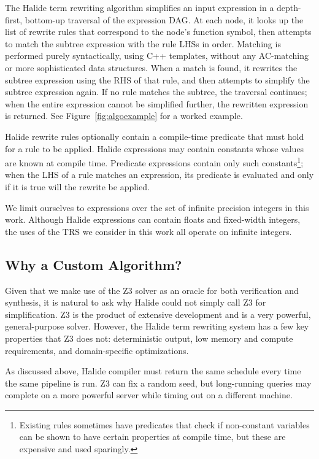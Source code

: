 \documentclass[acmsmall,review,anonymous]{acmart}\settopmatter{printfolios=true,printccs=false,printacmref=false}
\begin{document}
The Halide term rewriting algorithm simplifies an input expression in a
depth-first, bottom-up traversal of the expression DAG. At each node, it looks
up the list of rewrite rules that correspond to the node's function symbol, then
attempts to match the subtree expression with the rule LHSs in order. Matching is performed purely syntactically, using C++ templates, without any AC-matching or more sophisticated data structures. When a
match is found, it rewrites the subtree expression using the RHS of that rule,
and then attempts to simplify the subtree expression again. If no rule matches
the subtree, the traversal continues; when the entire expression cannot be
simplified further, the rewritten expression is returned. See Figure~\ref{fig:algoexample} for a worked example. 

Halide rewrite rules optionally contain a compile-time predicate that must hold for a rule to
be applied. Halide expressions may contain constants whose values are known at
compile time. Predicate expressions contain only such constants\footnote{Existing rules sometimes have predicates that check if non-constant variables can be shown to have certain properties at compile time, but these are expensive and used sparingly.}; when the
LHS of a rule matches an expression, its predicate is evaluated and only if it
is true will the rewrite be applied.

We limit ourselves to expressions over the set of infinite precision integers in
this work. Although Halide expressions can contain floats and fixed-width
integers, the uses of the TRS we consider in this work all operate
on infinite integers.

\subsection{Why a Custom Algorithm?}

Given that we make use of the Z3 solver as an oracle for both verification and synthesis, it is natural to ask why Halide could not simply call Z3 for simplification. Z3 is the product of extensive development and is a very powerful, general-purpose solver. However, the Halide term rewriting system has a few key properties that Z3 does not: deterministic output, low memory and compute requirements, and domain-specific optimizations.

As discussed above, Halide compiler must return the same schedule every time the same pipeline is run. Z3 can fix a random seed, but long-running queries may complete on a more powerful server while timing out on a different machine.
\end{document}
